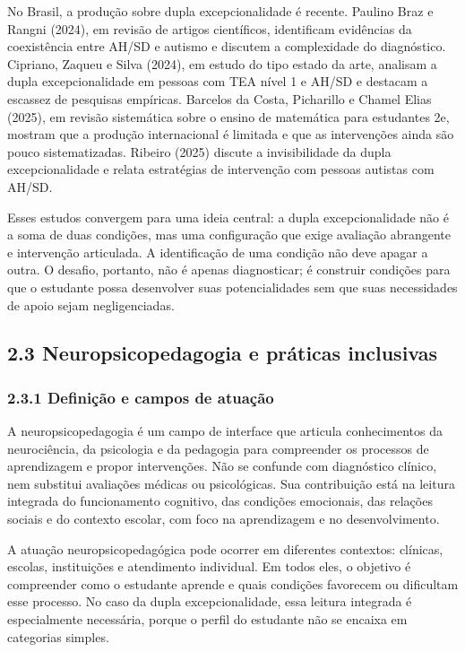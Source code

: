 No Brasil, a produção sobre dupla excepcionalidade é recente. Paulino
Braz e Rangni (2024), em revisão de artigos científicos, identificam
evidências da coexistência entre AH/SD e autismo e discutem a
complexidade do diagnóstico. Cipriano, Zaqueu e Silva (2024), em estudo
do tipo estado da arte, analisam a dupla excepcionalidade em pessoas com
TEA nível 1 e AH/SD e destacam a escassez de pesquisas empíricas.
Barcelos da Costa, Picharillo e Chamel Elias (2025), em revisão
sistemática sobre o ensino de matemática para estudantes 2e, mostram que
a produção internacional é limitada e que as intervenções ainda são
pouco sistematizadas. Ribeiro (2025) discute a invisibilidade da dupla
excepcionalidade e relata estratégias de intervenção com pessoas
autistas com AH/SD.

Esses estudos convergem para uma ideia central: a dupla excepcionalidade
não é a soma de duas condições, mas uma configuração que exige avaliação
abrangente e intervenção articulada. A identificação de uma condição não
deve apagar a outra. O desafio, portanto, não é apenas diagnosticar; é
construir condições para que o estudante possa desenvolver suas
potencialidades sem que suas necessidades de apoio sejam negligenciadas.

\subsection{2.3 Neuropsicopedagogia e práticas
inclusivas}\label{neuropsicopedagogia-e-pruxe1ticas-inclusivas}

\subsubsection{2.3.1 Definição e campos de
atuação}\label{definiuxe7uxe3o-e-campos-de-atuauxe7uxe3o}

A neuropsicopedagogia é um campo de interface que articula conhecimentos
da neurociência, da psicologia e da pedagogia para compreender os
processos de aprendizagem e propor intervenções. Não se confunde com
diagnóstico clínico, nem substitui avaliações médicas ou psicológicas.
Sua contribuição está na leitura integrada do funcionamento cognitivo,
das condições emocionais, das relações sociais e do contexto escolar,
com foco na aprendizagem e no desenvolvimento.

A atuação neuropsicopedagógica pode ocorrer em diferentes contextos:
clínicas, escolas, instituições e atendimento individual. Em todos eles,
o objetivo é compreender como o estudante aprende e quais condições
favorecem ou dificultam esse processo. No caso da dupla
excepcionalidade, essa leitura integrada é especialmente necessária,
porque o perfil do estudante não se encaixa em categorias simples.

